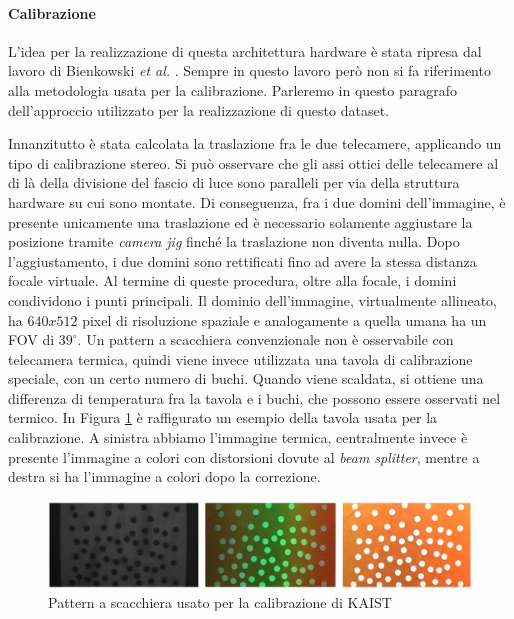 \paragraph{Calibrazione} L'idea per la realizzazione di questa architettura hardware è stata ripresa dal lavoro di Bienkowski \textit{et al.} \cite{bienkowski2012}. Sempre in questo lavoro però non si fa riferimento alla metodologia usata per la calibrazione. Parleremo in questo paragrafo dell'approccio utilizzato per la realizzazione di questo dataset. 

Innanzitutto è stata calcolata la traslazione fra le due telecamere, applicando un tipo di calibrazione stereo. Si può osservare che gli assi ottici delle telecamere al di là della divisione del fascio di luce sono paralleli per via della struttura hardware su cui sono montate. Di conseguenza, fra i due domini dell’immagine, è presente unicamente una traslazione ed è necessario solamente aggiustare la posizione tramite \textit{camera jig} finché la traslazione non diventa nulla. Dopo l’aggiustamento, i due domini sono rettificati fino ad avere la stessa distanza focale virtuale. Al termine di queste procedura, oltre alla focale, i domini condividono i punti principali.
Il dominio dell’immagine, virtualmente allineato, ha $640 x 512$ pixel di risoluzione spaziale e analogamente a quella umana ha un \ac{FOV} di $39^\circ$. Un pattern a scacchiera convenzionale non è osservabile con telecamera termica, quindi viene invece utilizzata una tavola di calibrazione speciale, con un certo numero di buchi. Quando viene scaldata, si ottiene una differenza di temperatura fra la tavola e i buchi, che possono essere osservati nel termico. In Figura \ref{fig:hole_pattern} è raffigurato un esempio della tavola usata per la calibrazione. A sinistra abbiamo l'immagine termica, centralmente invece è presente l'immagine a colori con distorsioni dovute al \textit{beam splitter}, mentre a destra si ha l'immagine a colori dopo la correzione.  

\begin{figure}[]
    \centering
    \includegraphics[width=\textwidth]{images/hole_pattern.jpg}
    \caption{Pattern a scacchiera usato per la calibrazione di KAIST}
    \label{fig:hole_pattern}
\end{figure} 

